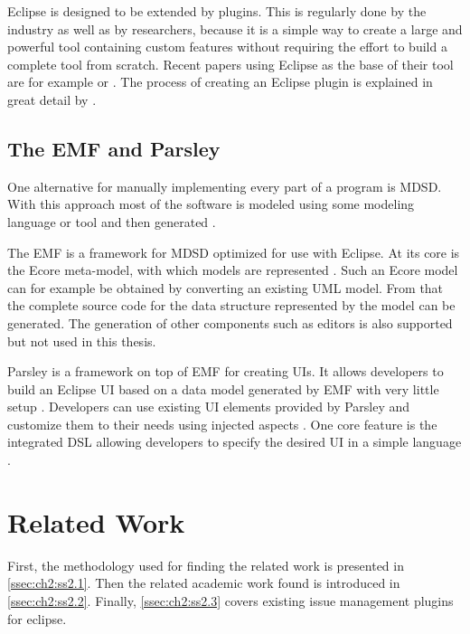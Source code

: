 Eclipse is designed to be extended by plugins. This is regularly done by the industry as well as by researchers, 
because it is a simple way to create a large and powerful tool containing custom features 
without requiring the effort to build a complete tool from scratch. 
Recent papers using Eclipse as the base of their tool are for example \cite{segura2019extremo} or \cite{hajji2019onto2db}. 
The process of creating an Eclipse plugin is explained in great detail by \cite{clayberg2006eclipse}.

\subsection{The \acrlong{EMF} and \gls{Parsley} }
\label{ssec:ch2:ss1.4}
One alternative for manually implementing every part of a program is \gls{MDSD}.
With this approach most of the software is modeled using some modeling language or tool and then generated \cite{volter2013model}. 

The \gls{EMF} is a framework for \gls{MDSD} optimized for use with \gls{Eclipse}.
At its core is the Ecore meta-model, with which models are represented \cite{steinberg2008emf}.
Such an Ecore model can for example be obtained by converting an existing \gls{UML} model.
From that the complete source code for the data structure represented by the model can be generated.
The generation of other components such as editors is also supported but not used in this thesis.

\Gls{Parsley} is a framework on top of \gls{EMF} for creating \glspl{UI}.
It allows developers to build an \gls{Eclipse} \gls{UI} based on a data model generated by \gls{EMF} with very little setup \cite{bettini2014developing}.
Developers can use existing \gls{UI} elements provided by \gls{Parsley} and customize them to their needs using injected aspects  \cite{bettini2014developing}.
One core feature is the integrated \gls{DSL} allowing developers to specify the desired \gls{UI} in a simple language \cite{bettini2014developing}.

\section{Related Work}
\label{sec:ch2:s2}
First, the methodology used for finding the related work is presented in \cref{ssec:ch2:ss2.1}.
Then the related academic work found is introduced in \cref{ssec:ch2:ss2.2}.
Finally, \cref{ssec:ch2:ss2.3} covers existing issue management plugins for eclipse.

